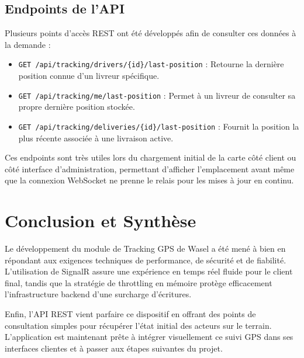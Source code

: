 \documentclass[11pt,a4paper]{report}
\begin{document}
\section{Endpoints de l'API}
Plusieurs points d'accès REST ont été développés afin de consulter ces données à la demande :
\begin{itemize}
    \item \texttt{GET /api/tracking/drivers/\{id\}/last-position} : Retourne la dernière position connue d'un livreur spécifique.
    \item \texttt{GET /api/tracking/me/last-position} : Permet à un livreur de consulter sa propre dernière position stockée.
    \item \texttt{GET /api/tracking/deliveries/\{id\}/last-position} : Fournit la position la plus récente associée à une livraison active.
\end{itemize}

\begin{notebox}
Ces endpoints sont très utiles lors du chargement initial de la carte côté client ou côté interface d'administration, permettant d'afficher l'emplacement avant même que la connexion WebSocket ne prenne le relais pour les mises à jour en continu.
\end{notebox}

\chapter*{Conclusion et Synthèse}
Le développement du module de Tracking GPS de Wasel a été mené à bien en répondant aux exigences techniques de performance, de sécurité et de fiabilité. 
L'utilisation de SignalR assure une expérience en temps réel fluide pour le client final, tandis que la stratégie de throttling en mémoire protège efficacement l'infrastructure backend d'une surcharge d'écritures. 

Enfin, l'API REST vient parfaire ce dispositif en offrant des points de consultation simples pour récupérer l'état initial des acteurs sur le terrain. L'application est maintenant prête à intégrer visuellement ce suivi GPS dans ses interfaces clientes et à passer aux étapes suivantes du projet.
\end{document}
